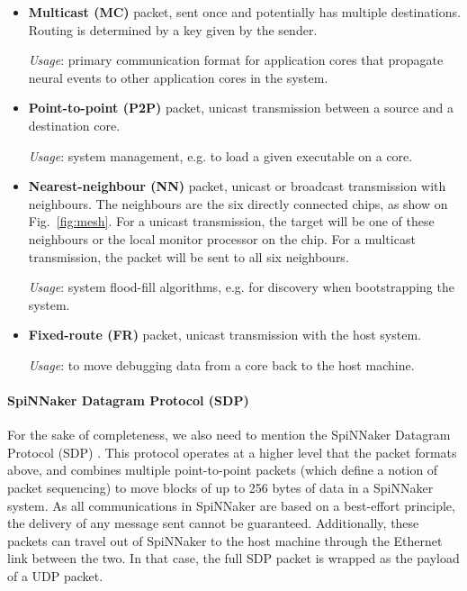 \begin{itemize}
\item \textbf{Multicast (MC)} packet, sent once and potentially has multiple destinations. Routing is determined by a key given by the sender. 

\textit{Usage}: primary communication format for application cores that propagate neural events to other application cores in the system.

\item \textbf{Point-to-point (P2P)} packet, unicast transmission between a source and a destination core. 

\textit{Usage}: system management, e.g. to load a given executable on a core.

\item \textbf{Nearest-neighbour (NN)} packet, unicast or broadcast transmission with  neighbours. The neighbours are the six directly connected chips, as show on Fig.~\ref{fig:mesh}. For a unicast transmission, the target will be one of these neighbours or the local monitor processor on the chip. For a multicast transmission, the packet will be sent to all six neighbours.

\textit{Usage}: system flood-fill algorithms, e.g. for discovery when bootstrapping the system.

\item \textbf{Fixed-route (FR)} packet, unicast transmission with the host system.

\textit{Usage}: to move debugging data from a core back to the host machine.
\end{itemize}


\paragraph{SpiNNaker Datagram Protocol (SDP)}

For the sake of completeness, we also need to mention the SpiNNaker Datagram Protocol (SDP) \cite{sdp}. This protocol operates at a higher level that the packet formats above, and combines multiple point-to-point packets (which define a notion of packet sequencing) to move blocks of up to 256 bytes of data in a SpiNNaker system. As all communications in SpiNNaker are based on a best-effort principle, the delivery of any message sent cannot be guaranteed. Additionally, these packets can travel out of SpiNNaker to the host machine through the Ethernet link between the two. In that case, the full SDP packet is wrapped as the payload of a UDP packet. \\

